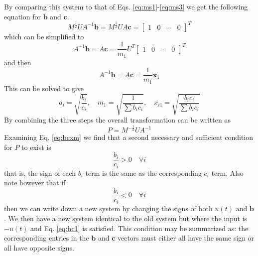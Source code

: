 \documentclass{mbd_fullpaper}
\begin{document}
By comparing this system to that of Eqs. \ref{eq:ms1}-\ref{eq:ms3} we get the following equation for $\mathbf{b}$ and $\mathbf{c}$.
\begin{equation}
M^{\frac{1}{2}} U A^{-1} \mathbf{b} = M^{\frac{1}{2}} U A \mathbf{c} = \begin{bmatrix} 1 &  0 & \cdots & 0 \end{bmatrix}^T
\label{eq:bhat}
\end{equation}
which can be simplified to
\begin{equation}
A^{-1} \mathbf{b} = A \mathbf{c} = \frac{1}{m_1} U^T \begin{bmatrix} 1 &  0 & \cdots & 0 \end{bmatrix}^T
\label{eq:bc1}
\end{equation}
and then
\begin{equation}
A^{-1} \mathbf{b} = A \mathbf{c} = \frac{1}{m_1} \mathbf{x}_1
\label{eq:bc2}
\end{equation}
This can be solved to give
\begin{equation}
a_i = \sqrt{\frac{b_i}{c_i}} ,\quad m_1 = \sqrt{\frac{1}{\sum b_i c_i}} ,\quad x_{i1} = \sqrt{\frac{b_i c_i}{\sum b_i c_i}}
\label{eq:bcxm}
\end{equation}
By combining the three steps the overall transformation can be written as
\begin{equation}
P =  M^{-\frac{1}{2}} U A^{-1}
\label{eq:p}
\end{equation}
Examining Eq. \ref{eq:bcxm} we find that a second necessary and sufficient condition for $P$ to exist is
\begin{equation}
\frac{b_i}{c_i} > 0 \quad \forall i
\label{eq:bc1}
\end{equation}
that is, the sign of each $b_i$ term is the same as the corresponding $c_i$ term. 
Also note however that if
\begin{equation}
\frac{b_i}{c_i} < 0 \quad \forall i
\label{eq:bc2}
\end{equation}
then we can write down a new system by changing the signs of both $u(t)$ and $\mathbf{b}$. We then have a new system identical to the old system but where the input is $-u(t)$ and Eq. \ref{eq:bc1} is satisfied.
This condition may be summarized as: the corresponding entries in the $\mathbf{b}$ and $\mathbf{c}$ vectors must either all have the same sign or all have opposite signs.
\end{document}
